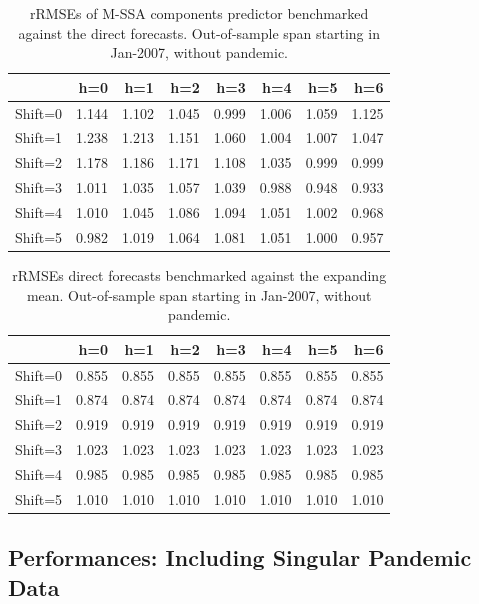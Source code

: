 \documentclass[a4paper]{article}
\begin{document}
\begin{table}[ht]
\centering
\begin{tabular}{rrrrrrrr}
  \hline
 & h=0 & h=1 & h=2 & h=3 & h=4 & h=5 & h=6 \\ 
  \hline
Shift=0 & 1.144 & 1.102 & 1.045 & 0.999 & 1.006 & 1.059 & 1.125 \\ 
  Shift=1 & 1.238 & 1.213 & 1.151 & 1.060 & 1.004 & 1.007 & 1.047 \\ 
  Shift=2 & 1.178 & 1.186 & 1.171 & 1.108 & 1.035 & 0.999 & 0.999 \\ 
  Shift=3 & 1.011 & 1.035 & 1.057 & 1.039 & 0.988 & 0.948 & 0.933 \\ 
  Shift=4 & 1.010 & 1.045 & 1.086 & 1.094 & 1.051 & 1.002 & 0.968 \\ 
  Shift=5 & 0.982 & 1.019 & 1.064 & 1.081 & 1.051 & 1.000 & 0.957 \\ 
   \hline
\end{tabular}
\caption{rRMSEs of M-SSA components predictor benchmarked against the direct forecasts. Out-of-sample span starting in Jan-2007, without pandemic.} 
\label{rRMSE_mSSA_comp_direct_without_covid7}
\end{table}%
\begin{table}[ht]
\centering
\begin{tabular}{rrrrrrrr}
  \hline
 & h=0 & h=1 & h=2 & h=3 & h=4 & h=5 & h=6 \\ 
  \hline
Shift=0 & 0.855 & 0.855 & 0.855 & 0.855 & 0.855 & 0.855 & 0.855 \\ 
  Shift=1 & 0.874 & 0.874 & 0.874 & 0.874 & 0.874 & 0.874 & 0.874 \\ 
  Shift=2 & 0.919 & 0.919 & 0.919 & 0.919 & 0.919 & 0.919 & 0.919 \\ 
  Shift=3 & 1.023 & 1.023 & 1.023 & 1.023 & 1.023 & 1.023 & 1.023 \\ 
  Shift=4 & 0.985 & 0.985 & 0.985 & 0.985 & 0.985 & 0.985 & 0.985 \\ 
  Shift=5 & 1.010 & 1.010 & 1.010 & 1.010 & 1.010 & 1.010 & 1.010 \\ 
   \hline
\end{tabular}
\caption{rRMSEs direct forecasts benchmarked against the expanding mean. Out-of-sample span starting in Jan-2007, without pandemic.} 
\label{rRMSE_mSSA_direct_mean_without_covid8}
\end{table}

\newpage
\subsection{Performances: Including Singular Pandemic Data}
\end{document}
